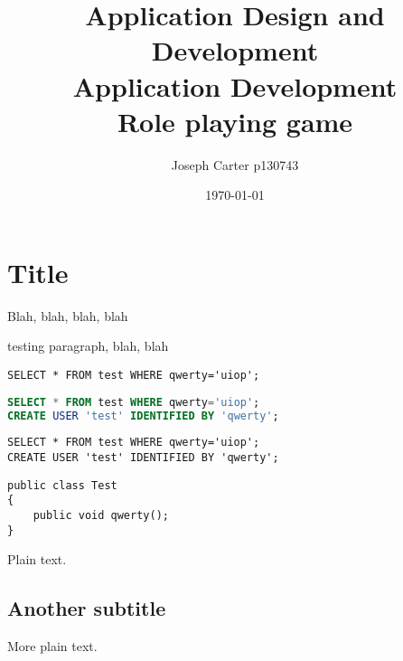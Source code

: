 \documentclass{template}
\author{Joseph Carter p130743}
\title{\textbf{Application Design and Development\\Application Development}\\ Role playing game}
\date{\today}
\begin{document}
\maketitle

\tableofcontents
\clearpage

\section{Title}
Blah, blah, blah, blah

testing paragraph, blah, blah

\begin{lstlisting}
SELECT * FROM test WHERE qwerty='uiop';
\end{lstlisting}

\begin{lstlisting}[language=sql]
SELECT * FROM test WHERE qwerty='uiop';
CREATE USER 'test' IDENTIFIED BY 'qwerty';
\end{lstlisting}

\begin{lstlisting}[language=orasql]
SELECT * FROM test WHERE qwerty='uiop';
CREATE USER 'test' IDENTIFIED BY 'qwerty';
\end{lstlisting}

\begin{lstlisting}[language={[Sharp]C}]
public class Test
{
	public void qwerty();
}
\end{lstlisting}

Plain text.

\subsection{Another subtitle}

More plain text.
\end{document}
